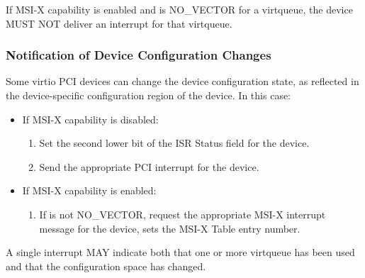 
If MSI-X capability is enabled and  is
NO_VECTOR for a virtqueue, the device MUST NOT deliver an interrupt
for that virtqueue.

\subsubsection{Notification of Device Configuration Changes}\label{sec:Virtio Transport Options / Virtio Over PCI Bus / PCI-specific Initialization And Device Operation / Notification of Device Configuration Changes}

Some virtio PCI devices can change the device configuration
state, as reflected in the device-specific configuration region of the device. In this case:

\begin{itemize}
  \item If MSI-X capability is disabled:
    \begin{enumerate}
    \item Set the second lower bit of the ISR Status field for the device.

    \item Send the appropriate PCI interrupt for the device.
    \end{enumerate}

  \item If MSI-X capability is enabled:
    \begin{enumerate}
    \item If  is not NO_VECTOR,
      request the appropriate MSI-X interrupt message for the
      device,  sets the MSI-X Table entry
      number.
    \end{enumerate}
\end{itemize}

A single interrupt MAY indicate both that one or more virtqueue has
been used and that the configuration space has changed.


